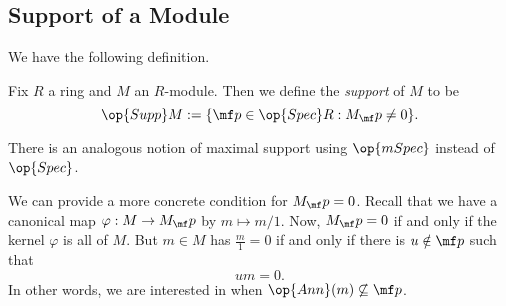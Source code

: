 \subsection{Support of a Module}
We have the following definition.
\begin{definition}[Support]
	Fix $R$ a ring and $M$ an $R$-module. Then we define the \textit{support} of $M$ to be
	\[\op{Supp}M:=\{\mf p\in\op{Spec}R:M_\mf p\ne0\}.\]
\end{definition}
There is an analogous notion of maximal support using $\op{mSpec}$ instead of $\op{Spec}$.

We can provide a more concrete condition for $M_\mf p=0$. Recall that we have a canonical map $\varphi:M\to M_\mf p$ by $m\mapsto m/1$. Now, $M_\mf p=0$ if and only if the kernel $\varphi$ is all of $M$. But $m\in M$ has $\frac m1=0$ if and only if there is $u\notin\mf p$ such that
\[um=0.\]
In other words, we are interested in when $\op{Ann}(m)\not\subseteq\mf p$.

